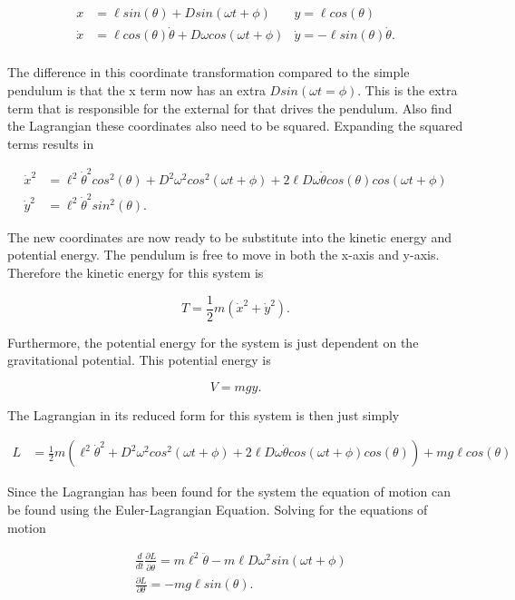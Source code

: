 \documentclass[runningheads]{llncs}
\begin{document}
\begin{align*}
x &= \ell sin(\theta) + Dsin(\omega t + \phi) & y = \ell cos(\theta) \\
\dot{x} &= \ell cos(\theta) \dot{\theta} + D\omega cos(\omega t + \phi) & \dot{y} = -\ell sin(\theta) \dot{\theta}. \\
\end{align*}

The difference in this coordinate transformation compared to the simple pendulum is that the x term now has an extra $D sin(\omega t = \phi)$. This is the extra term that is responsible for the external for that drives the pendulum. Also find the Lagrangian these coordinates also need to be squared. Expanding the squared terms results in

\begin{align*}
\dot{x}^{2} &= \ell^{2}\dot{\theta}^{2} cos^{2}(\theta) + D^{2}\omega^{2}cos^{2}(\omega t + \phi) + 2\ell D\omega \dot{\theta}cos(\theta)cos(\omega t + \phi) \\
\dot{y}^{2} &= \ell^{2}\dot{\theta}^{2}sin^{2}(\theta).
\end{align*}

The new coordinates are now ready to be substitute into the kinetic energy and potential energy. The pendulum is free to move in both the x-axis and y-axis. Therefore the kinetic energy for this system is 

$$
T = \frac{1}{2}m(\dot{x}^{2} + \dot{y}^{2}).
$$

\noindent

Furthermore, the potential energy for the system is just dependent on the gravitational potential. This potential energy is 

$$
V = mgy.
$$


\noindent
The Lagrangian in its reduced form for this system is then just simply 

\begin{align*}
L &= \frac{1}{2}m(\ell^{2}\dot{\theta}^{2} + D^{2}\omega^{2}cos^{2}(\omega t + \phi) + 2\ell D \omega \dot{\theta} cos(\omega t + \phi)cos(\theta)) + mg\ell cos(\theta)
\end{align*}

Since the Lagrangian has been found for the system the equation of motion can be found using the Euler-Lagrangian Equation. Solving for the equations of motion 

\begin{align*}
&\frac{d}{dt} \frac{\partial L}{\partial \dot{\theta}} = m\ell^{2} \ddot{\theta} - m\ell D\omega^{2} sin(\omega t + \phi)\\
&\frac{\partial L}{\partial \theta} =  - mg\ell sin(\theta).\\
\end{align*}
\end{document}

